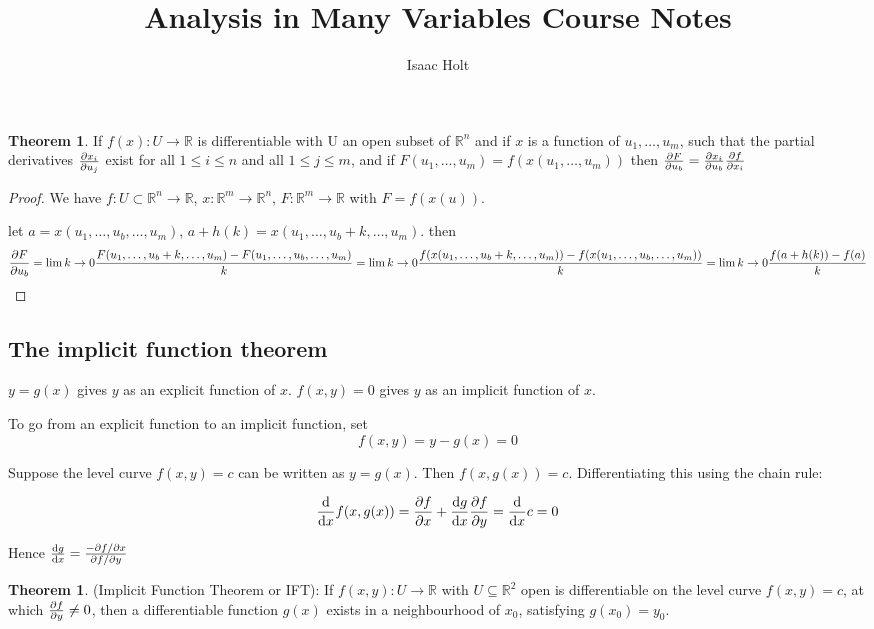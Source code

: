\documentclass[12pt,a4paper]{article}
\title{Analysis in Many Variables Course Notes}
\author{Isaac Holt}
\theoremstyle{definition}
\newtheorem{theorem}[definition]{Theorem}
\begin{document}
\begin{theorem}
	If $f(x): U \rightarrow \mathbb{R}$ is differentiable with U an open subset of $\mathbb{R}^n$ and if $x$ is a function of $u_1, \dots, u_m$, such that the partial derivatives $\diffp{x_i}{u_j}$ exist for all $1 \le i \le n$ and all $1 \le j \le m$, and if $F(u_1, \dots, u_m) = f(x(u_1, \dots, u_m))$ then $\diffp{F}{u_b} = \diffp{x_i}{u_b} \diffp{f}{x_i}$
\end{theorem}

\begin{proof}
	We have $f: U \subset \mathbb{R}^n \rightarrow \mathbb{R}$, $x: \mathbb{R}^m \rightarrow \mathbb{R}^n$, $F: \mathbb{R}^m \rightarrow \mathbb{R}$ with $F = f(x(u))$.

	let $a = x(u_1, \dots, u_b, \dots, u_m)$, $a + h(k) = x(u_1, \dots, u_b + k, \dots, u_m)$. then
	\[\diffp{F}{u_b} = \lim{k \rightarrow 0}{\frac{F(u_1, \dots, u_b + k, \dots, u_m) - F(u_1, \dots, u_b, \dots, u_m)}{k}} = \lim{k \rightarrow 0}{\frac{f(x(u_1, \dots, u_b + k, \dots, u_m)) - f(x(u_1, \dots, u_b, \dots, u_m))}{k}} = \lim{k \rightarrow 0}{\frac{f(a + h(k)) - f(a)}{k}}\]
\end{proof}

\subsection{The implicit function theorem}

$y = g(x)$ gives $y$ as an explicit function of $x$. $f(x, y) = 0$ gives $y$ as an implicit function of $x$.

To go from an explicit function to an implicit function, set \[f(x, y) = y - g(x) = 0\]

Suppose the level curve $f(x, y) = c$ can be written as $y = g(x)$. Then $f(x, g(x)) = c$. Differentiating this using the chain rule:

\[\diff{}{x}f(x, g(x)) = \diffp{f}{x} + \diff{g}{x}\diffp{f}{y} = \diff{}{x}c = 0\]

Hence $\diff{g}{x} = \frac{- \partial f / \partial x}{\partial f / \partial y}$

\begin{theorem}
	(Implicit Function Theorem or IFT): If $f(x, y): U \rightarrow \mathbb{R}$ with $U \subseteq \mathbb{R}^2$ open is differentiable on the level curve $f(x, y) = c$, at which $\diffp{f}{y} \ne 0$, then a differentiable function $g(x)$ exists in a neighbourhood of $x_0$, satisfying $g(x_0) = y_0$.
\end{theorem}
\end{document}
